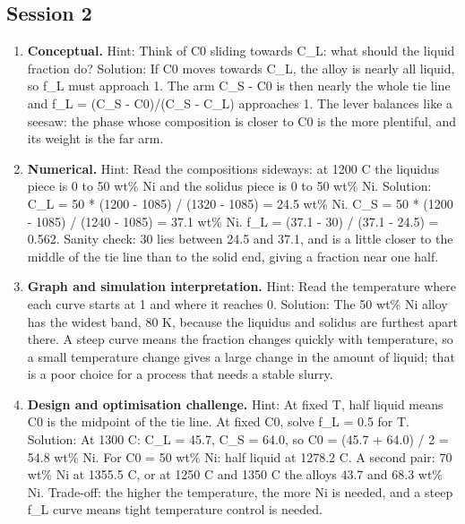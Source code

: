 \documentclass[11pt,a4paper]{article}
\begin{document}
\subsection*{Session 2}
\begin{enumerate}[nosep]
\item \textbf{Conceptual.} Hint: Think of C0 sliding towards C\_L: what should the liquid fraction do? Solution: If C0 moves towards C\_L, the alloy is nearly all liquid, so f\_L must approach 1. The arm C\_S - C0 is then nearly the whole tie line and f\_L = (C\_S - C0)/(C\_S - C\_L) approaches 1. The lever balances like a seesaw: the phase whose composition is closer to C0 is the more plentiful, and its weight is the far arm.
\item \textbf{Numerical.} Hint: Read the compositions sideways: at 1200 C the liquidus piece is 0 to 50 wt\% Ni and the solidus piece is 0 to 50 wt\% Ni. Solution: C\_L = 50 * (1200 - 1085) / (1320 - 1085) = 24.5 wt\% Ni. C\_S = 50 * (1200 - 1085) / (1240 - 1085) = 37.1 wt\% Ni. f\_L = (37.1 - 30) / (37.1 - 24.5) = 0.562. Sanity check: 30 lies between 24.5 and 37.1, and is a little closer to the middle of the tie line than to the solid end, giving a fraction near one half.
\item \textbf{Graph and simulation interpretation.} Hint: Read the temperature where each curve starts at 1 and where it reaches 0. Solution: The 50 wt\% Ni alloy has the widest band, 80 K, because the liquidus and solidus are furthest apart there. A steep curve means the fraction changes quickly with temperature, so a small temperature change gives a large change in the amount of liquid; that is a poor choice for a process that needs a stable slurry.
\item \textbf{Design and optimisation challenge.} Hint: At fixed T, half liquid means C0 is the midpoint of the tie line. At fixed C0, solve f\_L = 0.5 for T. Solution: At 1300 C: C\_L = 45.7, C\_S = 64.0, so C0 = (45.7 + 64.0) / 2 = 54.8 wt\% Ni. For C0 = 50 wt\% Ni: half liquid at 1278.2 C. A second pair: 70 wt\% Ni at 1355.5 C, or at 1250 C and 1350 C the alloys 43.7 and 68.3 wt\% Ni. Trade-off: the higher the temperature, the more Ni is needed, and a steep f\_L curve means tight temperature control is needed.
\end{enumerate}
\end{document}
